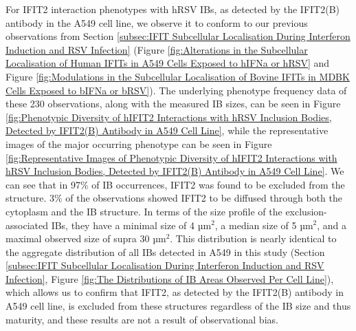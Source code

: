 For IFIT2 interaction phenotypes with hRSV IBs, as detected by the IFIT2(B) antibody in the A549 cell line, we observe it to conform to our previous observations from Section \ref{subsec:IFIT Subcellular Localisation During Interferon Induction and RSV Infection} (Figure \ref{fig:Alterations in the Subcellular Localisation of Human IFITs in A549 Cells Exposed to hIFNa or hRSV} and Figure \ref{fig:Modulations in the Subcellular Localisation of Bovine IFITs in MDBK Cells Exposed to bIFNa or bRSV}). The underlying phenotype frequency data of these 230 observations, along with the measured IB sizes, can be seen in Figure \ref{fig:Phenotypic Diversity of hIFIT2 Interactions with hRSV Inclusion Bodies, Detected by IFIT2(B) Antibody in A549 Cell Line}, while the representative images of the major occurring phenotype can be seen in Figure \ref{fig:Representative Images of Phenotypic Diversity of hIFIT2 Interactions with hRSV Inclusion Bodies, Detected by IFIT2(B) Antibody in A549 Cell Line}. We can see that in 97\% of IB occurrences, IFIT2 was found to be excluded from the structure. 3\% of the observations showed IFIT2 to be diffused through both the cytoplasm and the IB structure. In terms of the size profile of the exclusion-associated IBs, they have a minimal size of 4 \(\mbox{µm}^2\), a median size of 5 \(\mbox{µm}^2\), and a maximal observed size of supra 30 \(\mbox{µm}^2\). This distribution is nearly identical to the aggregate distribution of all IBs detected in A549 in this study (Section \ref{subsec:IFIT Subcellular Localisation During Interferon Induction and RSV Infection}, Figure \ref{fig:The Distributions of IB Areas Observed Per Cell Line}), which allows us to confirm that IFIT2, as detected by the IFIT2(B) antibody in A549 cell line, is excluded from these structures regardless of the IB size and thus maturity, and these results are not a result of observational bias.

